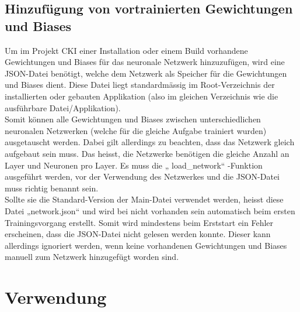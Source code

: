 \subsection{Hinzufügung von vortrainierten Gewichtungen und Biases}
\label{sec:InstallHinzufügungVonVortrainiertenGewichtungenUndBiases}
Um im Projekt CKI einer Installation oder einem Build vorhandene Gewichtungen und Biases für das neuronale Netzwerk hinzuzufügen, wird eine JSON-Datei benötigt, welche dem Netzwerk als Speicher für die Gewichtungen und Biases dient. Diese Datei liegt standardmässig im Root-Verzeichnis der installierten oder gebauten Applikation (also im gleichen Verzeichnis wie die ausführbare Datei/Applikation).
\\
Somit können alle Gewichtungen und Biases zwischen unterschiedlichen neuronalen Netzwerken (welche für die gleiche Aufgabe trainiert wurden) ausgetauscht werden. Dabei gilt allerdings zu beachten, dass das Netzwerk gleich aufgebaut sein muss. Das heisst, die Netzwerke benötigen die gleiche Anzahl an Layer und Neuronen pro Layer. Es muss die „ load_network“ -Funktion ausgeführt werden, vor der Verwendung des Netzwerkes und die JSON-Datei muss richtig benannt sein.
\\
Sollte sie die Standard-Version der Main-Datei verwendet werden, heisst diese Datei „network.json“ und wird bei nicht vorhanden sein automatisch beim ersten Trainingsvorgang erstellt. Somit wird mindestens beim Erststart ein Fehler erscheinen, dass die JSON-Datei nicht gelesen werden konnte. Dieser kann allerdings ignoriert werden, wenn keine vorhandenen Gewichtungen und Biases manuell zum Netzwerk hinzugefügt worden sind.

\section{Verwendung}
